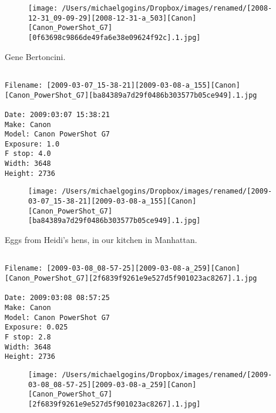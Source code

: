 \documentclass[11pt,letter,DIV=14,paper=landscape]{scrbook}
\begin{document}
\begin{figure}
\texttt{[image: /Users/michaelgogins/Dropbox/images/renamed/[2008-12-31\_09-09-29][2008-12-31-a\_503][Canon][Canon\_PowerShot\_G7][0f63698c9866de49fa6e38e09624f92c].1.jpg]}
\end{figure}
    
\clearpage
\noindent Gene Bertoncini.
\noindent
\begin{lstlisting}

Filename: [2009-03-07_15-38-21][2009-03-08-a_155][Canon][Canon_PowerShot_G7][ba84389a7d29f0486b303577b05ce949].1.jpg

Date: 2009:03:07 15:38:21
Make: Canon
Model: Canon PowerShot G7
Exposure: 1.0
F stop: 4.0
Width: 3648
Height: 2736
\end{lstlisting}
\clearpage

\begin{figure}
\texttt{[image: /Users/michaelgogins/Dropbox/images/renamed/[2009-03-07\_15-38-21][2009-03-08-a\_155][Canon][Canon\_PowerShot\_G7][ba84389a7d29f0486b303577b05ce949].1.jpg]}
\end{figure}
    
\clearpage
\noindent Eggs from Heidi's hens, in our kitchen in Manhattan.
\noindent
\begin{lstlisting}

Filename: [2009-03-08_08-57-25][2009-03-08-a_259][Canon][Canon_PowerShot_G7][2f6839f9261e9e527d5f901023ac8267].1.jpg

Date: 2009:03:08 08:57:25
Make: Canon
Model: Canon PowerShot G7
Exposure: 0.025
F stop: 2.8
Width: 3648
Height: 2736
\end{lstlisting}
\clearpage

\begin{figure}
\texttt{[image: /Users/michaelgogins/Dropbox/images/renamed/[2009-03-08\_08-57-25][2009-03-08-a\_259][Canon][Canon\_PowerShot\_G7][2f6839f9261e9e527d5f901023ac8267].1.jpg]}
\end{figure}
    
\end{document}
